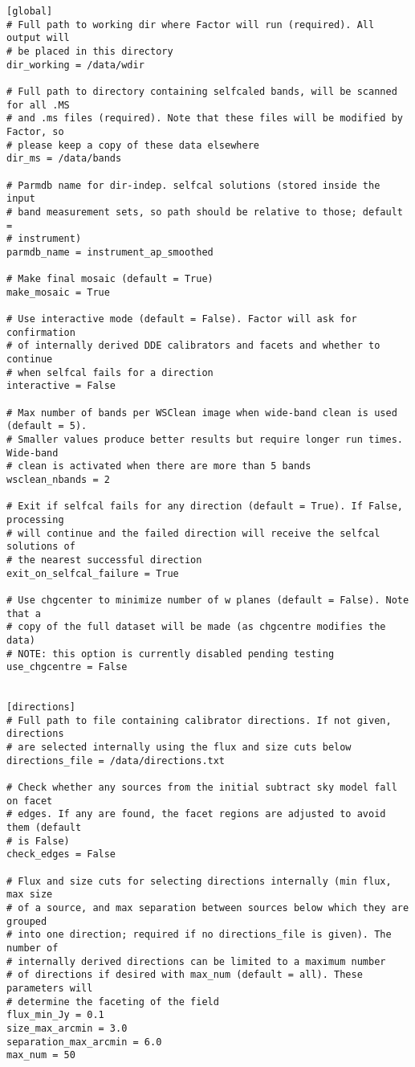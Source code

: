 \documentclass[structabstract]{article}
\begin{document}
\begin{verbatim}
[global]
# Full path to working dir where Factor will run (required). All output will
# be placed in this directory
dir_working = /data/wdir

# Full path to directory containing selfcaled bands, will be scanned for all .MS
# and .ms files (required). Note that these files will be modified by Factor, so
# please keep a copy of these data elsewhere
dir_ms = /data/bands

# Parmdb name for dir-indep. selfcal solutions (stored inside the input
# band measurement sets, so path should be relative to those; default =
# instrument)
parmdb_name = instrument_ap_smoothed

# Make final mosaic (default = True)
make_mosaic = True

# Use interactive mode (default = False). Factor will ask for confirmation
# of internally derived DDE calibrators and facets and whether to continue
# when selfcal fails for a direction
interactive = False

# Max number of bands per WSClean image when wide-band clean is used (default = 5).
# Smaller values produce better results but require longer run times. Wide-band
# clean is activated when there are more than 5 bands
wsclean_nbands = 2

# Exit if selfcal fails for any direction (default = True). If False, processing
# will continue and the failed direction will receive the selfcal solutions of
# the nearest successful direction
exit_on_selfcal_failure = True

# Use chgcenter to minimize number of w planes (default = False). Note that a
# copy of the full dataset will be made (as chgcentre modifies the data)
# NOTE: this option is currently disabled pending testing
use_chgcentre = False


[directions]
# Full path to file containing calibrator directions. If not given, directions
# are selected internally using the flux and size cuts below
directions_file = /data/directions.txt

# Check whether any sources from the initial subtract sky model fall on facet
# edges. If any are found, the facet regions are adjusted to avoid them (default
# is False)
check_edges = False

# Flux and size cuts for selecting directions internally (min flux, max size
# of a source, and max separation between sources below which they are grouped
# into one direction; required if no directions_file is given). The number of
# internally derived directions can be limited to a maximum number
# of directions if desired with max_num (default = all). These parameters will
# determine the faceting of the field
flux_min_Jy = 0.1
size_max_arcmin = 3.0
separation_max_arcmin = 6.0
max_num = 50


\end{verbatim}
\end{document}
